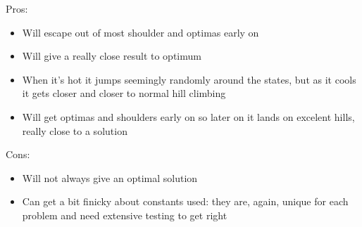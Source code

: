 \documentclass[10pt,a4paper]{article}
\begin{document}
\begin{enumerate}
				Pros:
				\begin{itemize}
                                        \item Will escape out of most shoulder and optimas early on
                                        \item Will give a really close result to optimum
                                        \item When it's hot it jumps seemingly randomly around the states, but as it cools it gets closer and closer to normal hill climbing
					\item Will get optimas and shoulders early on so later on it lands on excelent hills, really close to a solution
                                \end{itemize} 
                                Cons:
                                \begin{itemize}
                                        \item Will not always give an optimal solution
                                        \item Can get a bit finicky about constants used: they are, again, unique for each problem and need extensive testing to get right
                                \end{itemize}
		\end{enumerate}
	\pagebreak
\end{document}
